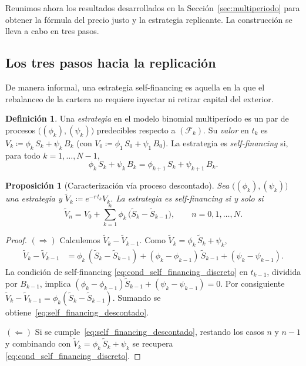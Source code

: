 \documentclass[11pt,a4paper,oneside]{report}
\theoremstyle{plain}
\newtheorem{proposicion}[teorema]{Proposición}
\theoremstyle{definition}
\newtheorem{definicion}[teorema]{Definición}
\theoremstyle{remark}
\newcommand{\F}{\mathcal{F}}
\newcommand{\1}{\mathbf{1}}
\newcommand{\eqdef}{\coloneqq}
\begin{document}
Reunimos ahora los resultados desarrollados en la Sección~\ref{sec:multiperiodo} para obtener la fórmula del precio justo y la estrategia replicante. La construcción se lleva a cabo en tres pasos.

\subsection{Los tres pasos hacia la replicación}
\label{subsec:tres_pasos_discreto}

De manera informal, una
estrategia self-financing es aquella en la que el rebalanceo de la
cartera no requiere inyectar ni retirar capital del exterior.

\begin{definicion}
\label{def:self_financing_discreto}
Una \emph{estrategia} en el modelo binomial multiperíodo es un par de
procesos $\bigl((\phi_k), (\psi_k)\bigr)$ predecibles respecto a
$(\F_k)$. Su \emph{valor} en $t_k$ es $V_k \eqdef \phi_k\, S_k +
\psi_k\, B_k$ (con $V_0 \eqdef \phi_1\, S_0 + \psi_1\, B_0$). La
estrategia es \emph{self-financing} si, para todo $k = 1, \ldots, N - 1$,
\begin{equation}\label{eq:cond_self_financing_discreto}
  \phi_k\, S_k + \psi_k\, B_k = \phi_{k+1}\, S_k + \psi_{k+1}\, B_k.
\end{equation}
\end{definicion}

\begin{proposicion}[Caracterización vía proceso descontado]
\label{prop:caracterizacion_self_financing}
Sea $\bigl((\phi_k), (\psi_k)\bigr)$ una estrategia y $\widetilde V_k
\eqdef e^{-r\, t_k} V_k$. La estrategia es self-financing si y solo si
\begin{equation}\label{eq:self_financing_descontado}
  \widetilde V_n = V_0 + \sum_{k=1}^{n} \phi_k\,
                   \bigl(\widetilde S_k - \widetilde S_{k-1}\bigr),
  \qquad n = 0, 1, \ldots, N.
\end{equation}
\end{proposicion}

\begin{proof}
$(\Rightarrow)$ Calculemos $\widetilde V_k - \widetilde V_{k-1}$. Como
$\widetilde V_k = \phi_k\, \widetilde S_k + \psi_k$,
\begin{align*}
  \widetilde V_k - \widetilde V_{k-1}
  &= \phi_k\, (\widetilde S_k - \widetilde S_{k-1})
   + (\phi_k - \phi_{k-1})\, \widetilde S_{k-1}
   + (\psi_k - \psi_{k-1}).
\end{align*}
La condición de self-financing
\eqref{eq:cond_self_financing_discreto} en $t_{k-1}$, dividida por
$B_{k-1}$, implica $(\phi_k - \phi_{k-1}) \widetilde S_{k-1} + (\psi_k
- \psi_{k-1}) = 0$. Por consiguiente $\widetilde V_k - \widetilde
V_{k-1} = \phi_k(\widetilde S_k - \widetilde S_{k-1})$. Sumando se
obtiene~\eqref{eq:self_financing_descontado}.

$(\Leftarrow)$ Si se cumple~\eqref{eq:self_financing_descontado},
restando los casos $n$ y $n-1$ y combinando con $\widetilde V_k =
\phi_k\, \widetilde S_k + \psi_k$ se recupera
\eqref{eq:cond_self_financing_discreto}.
\end{proof}
\end{document}
